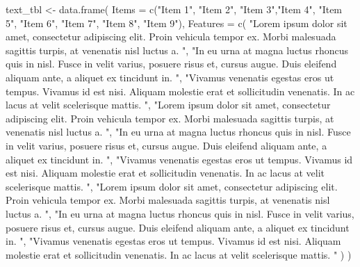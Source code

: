 \documentclass[12pt,a4paper,oneside,]{book}
\newenvironment{Shaded}{\begin{snugshade}}{\end{snugshade}}
\newcommand{\AttributeTok}[1]{\textcolor[rgb]{0.77,0.63,0.00}{#1}}
\newcommand{\FunctionTok}[1]{\textcolor[rgb]{0.00,0.00,0.00}{#1}}
\newcommand{\NormalTok}[1]{#1}
\newcommand{\OtherTok}[1]{\textcolor[rgb]{0.56,0.35,0.01}{#1}}
\newcommand{\StringTok}[1]{\textcolor[rgb]{0.31,0.60,0.02}{#1}}
\numberwithin{dummy}{section}
\theoremstyle{ocrenumbox}
\theoremstyle{blacknumex}
\theoremstyle{blacknumbox}
\theoremstyle{ocrenum}
\theoremstyle{ocrenum}
\begin{document}
\begin{Shaded}
\begin{Highlighting}[]
\NormalTok{text\_tbl }\OtherTok{\textless{}{-}} \FunctionTok{data.frame}\NormalTok{(}
  \AttributeTok{Items =} \FunctionTok{c}\NormalTok{(}\StringTok{"Item 1"}\NormalTok{, }\StringTok{"Item 2"}\NormalTok{, }\StringTok{"Item 3"}\NormalTok{,}\StringTok{"Item 4"}\NormalTok{, }\StringTok{"Item 5"}\NormalTok{, }\StringTok{"Item 6"}\NormalTok{, }
            \StringTok{"Item 7"}\NormalTok{, }\StringTok{"Item 8"}\NormalTok{, }\StringTok{"Item 9"}\NormalTok{), }
  \AttributeTok{Features =} \FunctionTok{c}\NormalTok{(}
    \StringTok{"Lorem ipsum dolor sit amet, consectetur adipiscing elit.}
\StringTok{    Proin vehicula tempor ex. Morbi malesuada sagittis turpis,}
\StringTok{    at venenatis nisl luctus a. "}\NormalTok{,}
    \StringTok{"In eu urna at magna luctus rhoncus quis in nisl. Fusce in velit}
\StringTok{    varius, posuere risus et, cursus augue. Duis eleifend aliquam ante,}
\StringTok{    a aliquet ex tincidunt in. "}\NormalTok{,}
    \StringTok{"Vivamus venenatis egestas eros ut tempus. Vivamus id est nisi.}
\StringTok{    Aliquam molestie erat et sollicitudin venenatis. In ac lacus at}
\StringTok{    velit scelerisque mattis. "}\NormalTok{,}
    \StringTok{"Lorem ipsum dolor sit amet, consectetur adipiscing elit.}
\StringTok{    Proin vehicula tempor ex. Morbi malesuada sagittis turpis,}
\StringTok{    at venenatis nisl luctus a. "}\NormalTok{,}
    \StringTok{"In eu urna at magna luctus rhoncus quis in nisl. Fusce in velit}
\StringTok{    varius, posuere risus et, cursus augue. Duis eleifend aliquam ante,}
\StringTok{    a aliquet ex tincidunt in. "}\NormalTok{,}
    \StringTok{"Vivamus venenatis egestas eros ut tempus. Vivamus id est nisi.}
\StringTok{    Aliquam molestie erat et sollicitudin venenatis. In ac lacus at}
\StringTok{    velit scelerisque mattis. "}\NormalTok{,}
    \StringTok{"Lorem ipsum dolor sit amet, consectetur adipiscing elit.}
\StringTok{    Proin vehicula tempor ex. Morbi malesuada sagittis turpis,}
\StringTok{    at venenatis nisl luctus a. "}\NormalTok{,}
    \StringTok{"In eu urna at magna luctus rhoncus quis in nisl. Fusce in velit}
\StringTok{    varius, posuere risus et, cursus augue. Duis eleifend aliquam ante,}
\StringTok{    a aliquet ex tincidunt in. "}\NormalTok{,}
    \StringTok{"Vivamus venenatis egestas eros ut tempus. Vivamus id est nisi.}
\StringTok{    Aliquam molestie erat et sollicitudin venenatis. In ac lacus at}
\StringTok{    velit scelerisque mattis. "}
\NormalTok{    ) }
\NormalTok{  )}

\end{Highlighting}
\end{Shaded}
\end{document}
